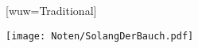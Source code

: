 [wuw={Traditional}]

\beginverse
\endverse
\centering\texttt{[image: Noten/SolangDerBauch.pdf]}

\endsong
